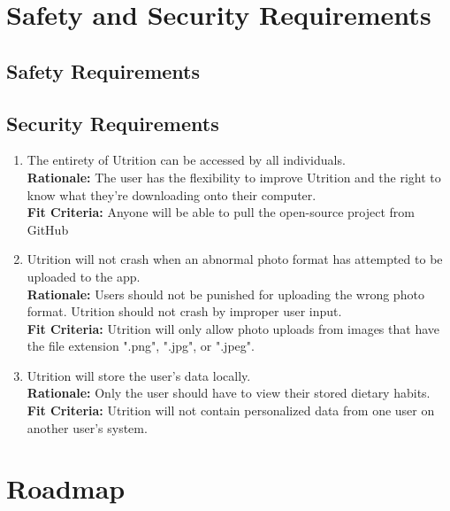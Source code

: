 \documentclass{article}
\begin{document}
\section{Safety and Security Requirements}
\subsection{Safety Requirements}
\subsection{Security Requirements}

\begin{enumerate}[{SCR}1.] 
	\item The entirety of Utrition can be accessed by all individuals. \\
	\textbf{Rationale:} The user has the flexibility to improve Utrition 
	and the right to know what they’re downloading onto their computer.  
	\\	
	\textbf{Fit Criteria:} Anyone will be able to pull the open-source 
	project from GitHub
 
	\item Utrition will not crash when an abnormal photo format has 
	attempted to be uploaded to the app. \\
	\textbf{Rationale:} Users should not be punished for uploading the 
	wrong photo format. Utrition should not crash by improper user 
	input.\\	
	\textbf{Fit Criteria:}  Utrition will only allow photo uploads from 
	images that have the file extension ".png", ".jpg", or ".jpeg".
	
	\item Utrition will store the user’s data locally. \\
	\textbf{Rationale:} 
	Only the user should have to view their stored dietary habits. \\	
	\textbf{Fit Criteria:} Utrition will not contain personalized data from 
	one user on another user's system.
\end{enumerate}

\section{Roadmap}

	
\end{document}
